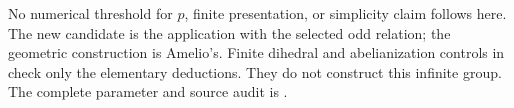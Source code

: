 No numerical threshold for \(p\), finite presentation, or simplicity
claim follows here. The new candidate is the application with the
selected odd relation; the geometric construction is Amelio's.
Finite dihedral and abelianization controls in
 check only the elementary
deductions. They do not construct this infinite group.
The complete parameter and source audit is
.

